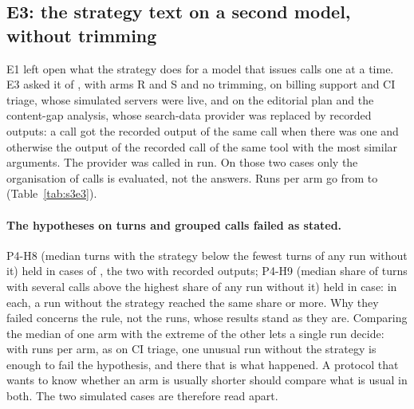\subsection{E3: the strategy text on a second model, without trimming}
\label{sec:s3e3}

E1 left open what the strategy does for a model that issues calls one at a time. E3 asked it of
\texttt{\SthreeModelB}, with arms R and S and no trimming, on billing support and CI triage, whose simulated
servers were live, and on the editorial plan and the content-gap analysis, whose search-data provider was replaced
by recorded outputs: a call got the recorded output of the same call when there was one and otherwise the output of
the recorded call of the same tool with the most similar arguments. The provider was called in \SthreeProviderCallsEThree{} run.
On those two cases only the organisation of calls is evaluated, not the answers. Runs per arm go from
\SthreeEThreeRunsPerArmMin{} to \SthreeEThreeRunsPerArmMax{} (Table~\ref{tab:s3e3}).

\begin{table}[t]
\centering\small
\resizebox{\textwidth}{!}{}
\caption{E3, \texttt{\SthreeModelB}, without and with the strategy text, no trimming. Turns, tool calls and turns with several calls as in
Table~\ref{tab:s3e1}; billed input as in Table~\ref{tab:s3e1tokens}; LLM API cost per run relative to the arm without
the strategy, from billed usage at the model's list prices. Billed tokens are
not comparable with E1's (another tokenizer, price list and caching). $^\dagger$Simulated tools, live.
$^\ddagger$Recorded outputs in place of the provider: calls and turns only.}
\label{tab:s3e3}
\end{table}

\paragraph{The hypotheses on turns and grouped calls failed as stated.} P4-H8 (median turns with the strategy below
the fewest turns of any run without it) held in \SthreeHEightHolds{} cases of \SthreeHEightOf, the two with
recorded outputs; P4-H9 (median share of turns with several calls above the highest share of any run without it) held
in \SthreeHNineHolds{} case: in each, a run without the strategy reached the same share or more. Why they failed
concerns the rule, not the runs, whose results stand as they are. Comparing the median of one arm with the extreme
of the other lets a single run decide: with \SthreeEThreeRunsCv{} runs per arm, as on CI triage, one unusual run without the strategy
is enough to fail the hypothesis, and there that is what happened. A protocol that wants to know whether an
arm is usually shorter should compare what is usual in both. The two simulated cases are therefore read apart.


